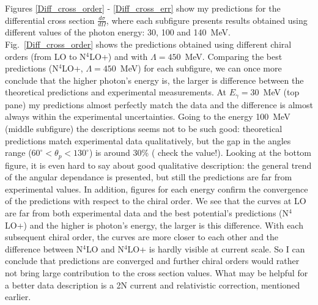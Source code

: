         
    Figures \ref{Diff_cross_order} - \ref{Diff_cross_err} show my predictions for the differential cross section
    $\frac{d\sigma}{d\Omega}$, where each subfigure 
    presents results obtained using different values of the photon energy:
    30, 100 and 140~MeV. 
    Fig.~\ref{Diff_cross_order} shows the predictions obtained using 
    different chiral orders (from LO to N$^4$LO+) and with $\Lambda=450$~MeV.
    Comparing the best predictions (N$^4$LO+, $\Lambda=450$~MeV) for each
    subfigure, we can once more 
    conclude that the higher photon's energy is, the larger is 
    difference between the theoretical predictions and experimental 
    measurements. At $E_\gamma = 30$~MeV (top pane) my predictions
    almost perfectly match the data and the difference is almost always
    within the experimental uncertainties. Going to the energy 100~MeV (middle subfigure)
    the descriptions seems not to be such good: theoretical
    predictions match experimental data qualitatively, but
    the gap in the angles range ($60^{\circ} < \theta_p < 130^{\circ}$) 
    is around 30\% ({\color{red} check the value!}).
    Looking at the bottom figure, it is even hard to say about 
    good qualitative description: the general trend of the
    angular dependance is presented, but still the predictions are 
    far from experimental values.
    In addition, figures for each energy confirm the convergence 
    of the predictions with respect to the chiral order.
    We see that the curves at LO are far from both experimental 
    data and the best potential's predictions (N$^4$LO+) and
    the higher is photon's energy, the larger is this
    difference. With each subsequent chiral order, the 
    curves are more closer to each other and the difference
    between N$^4$LO and N$^4$LO+ is hardly visible at current scale.
    So I can conclude that predictions are converged and 
    further chiral orders would rather not bring large contribution 
    to the cross section values. What may be helpful
    for a better data description is a 2N current 
    and relativistic correction, mentioned earlier.

